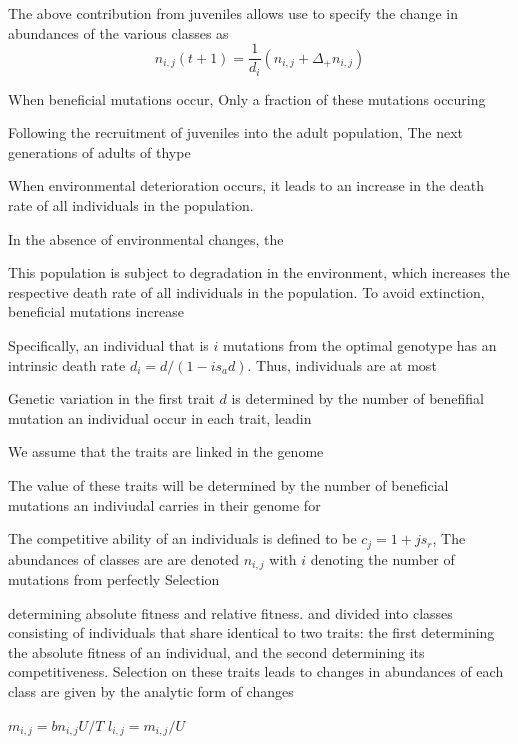\documentclass[9pt,twocolumn,twoside]{article}
\begin{document}
The above contribution from juveniles allows use to specify the change in abundances of the various classes as 
\begin{equation}
    n_{i,j}(t+1) = \frac{1}{d_i}\left(n_{i,j} + \Delta_{+}n_{i,j}\right)
\end{equation}


When beneficial mutations occur, Only a fraction of these  mutations occuring

Following the recruitment of juveniles into the adult population, The next generations of adults of thype 




When environmental deterioration occurs, it leads to an increase in the death rate of all individuals in the population.

In the absence of environmental changes, the 


This population is subject to degradation in the environment, which increases the respective death rate of all individuals in the population. To avoid extinction, beneficial mutations increase 



Specifically, an individual that is $i$ mutations from the optimal genotype has an intrinsic death rate $d_i = d/(1-is_a d)$. Thus, individuals are at most 

Genetic variation in the first trait $d$ is determined by the number of benefifial mutation an individual occur in each trait, leadin 

We assume that the traits are linked in the genome


The value of these traits will be determined by the number of beneficial mutations an indiviudal carries in their genome for 





The competitive ability of an individuals is defined to be $c_j=1+j s_r$, 
The abundances of classes are are denoted $n_{i,j}$ with $i$ denoting the number of mutations from perfectly Selection



determining absolute fitness and relative fitness. and divided into classes consisting of individuals that share identical to two traits: the first determining the absolute fitness of an individual, and the second determining its competitiveness. Selection on these traits leads to changes in abundances of each class are given by the analytic form of changes 

$m_{i,j} = b n_{i,j} U/T$
$l_{i,j} = m_{i,j}/U$
\end{document}
